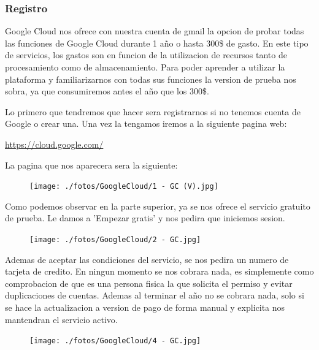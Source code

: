 \documentclass[a4paper,10pt]{article}
\begin{document}
\subsubsection{Registro}

Google Cloud nos ofrece con nuestra cuenta de gmail la opcion de probar todas las funciones de Google Cloud durante 1 año o hasta 300\$ de gasto. En este tipo de servicios, los gastos son en funcion de la utilizacion de recursos tanto de procesamiento como de almacenamiento. Para poder aprender a utilizar la plataforma y familiarizarnos con todas sus funciones la version de prueba nos sobra, ya que consumiremos antes el año que los 300\$.

Lo primero que tendremos que hacer sera registrarnos si no tenemos cuenta de Google o crear una. Una vez la tengamos iremos a la siguiente pagina web:

\begin{center}
\href{https://cloud.google.com/}{https://cloud.google.com/}
\end{center}

La pagina que nos aparecera sera la siguiente:

\begin{figure}[H]
\begin{center}
\texttt{[image: ./fotos/GoogleCloud/1 - GC (V).jpg]}
\end{center}
\end{figure}

Como podemos observar en la parte superior, ya se nos ofrece el servicio gratuito de prueba. Le damos a 'Empezar gratis' y nos pedira que iniciemos sesion.

\begin{figure}[H]
\begin{center}
\texttt{[image: ./fotos/GoogleCloud/2 - GC.jpg]}
\end{center}
\end{figure}

Ademas de aceptar las condiciones del servicio, se nos pedira un numero de tarjeta de credito. En ningun momento se nos cobrara nada, es simplemente como comprobacion de que es una persona fisica la que solicita el permiso y evitar duplicaciones de cuentas. Ademas al terminar el año no se cobrara nada, solo si se hace la actualizacion a version de pago de forma manual y explicita nos mantendran el servicio activo.

\begin{figure}[H]
\begin{center}
\texttt{[image: ./fotos/GoogleCloud/4 - GC.jpg]}
\end{center}
\end{figure}
\end{document}
